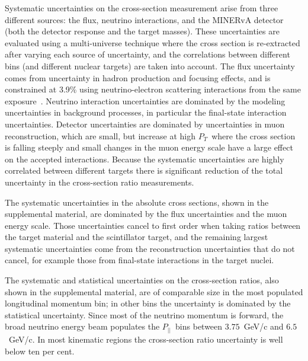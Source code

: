 \documentclass[aps,prl,twocolumn,superscriptaddress,nofootinbib]{revtex4}
\newcommand{\ptmu}{$P_{T}$}
\newcommand{\pparmu}{$P_{||}$}
\begin{document}
Systematic uncertainties on the cross-section measurement arise from three different sources:  the flux, neutrino interactions, and the MINERvA detector (both the detector response and the target masses).  These uncertainties are evaluated using a multi-universe technique where the cross section is re-extracted after varying each source of uncertainty, and the correlations between different bins (and different nuclear targets) are taken into account.  
The flux uncertainty comes from uncertainty in hadron production and focusing effects, and is constrained at 3.9\% using neutrino-electron scattering interactions from the same exposure~\cite{MINERvA:2019mkf}. Neutrino interaction uncertainties are dominated by the modeling uncertainties in background processes, in particular the final-state interaction uncertainties.  Detector uncertainties are dominated by uncertainties in muon reconstruction, which are small, but increase at high \ptmu\ where the cross section is falling steeply and small changes in the muon energy scale have a large effect on the accepted interactions.  Because the systematic uncertainties are highly correlated between different targets there is significant reduction of the total uncertainty in the cross-section ratio measurements.  

The systematic uncertainties in the absolute cross sections, shown in the supplemental material, are dominated by the flux uncertainties and the muon energy scale.  Those uncertainties cancel to first order when taking ratios between the target material and the scintillator target, and the remaining largest systematic uncertainties come from the reconstruction uncertainties that do not cancel, for example those from final-state interactions in the target nuclei.  
  
The systematic and statistical uncertainties on the cross-section ratios, also shown in the supplemental material, are of comparable size in the most populated longitudinal momentum bin; in other bins the uncertainty is dominated by the statistical uncertainty.  Since most of the neutrino momentum is forward, the broad neutrino energy beam populates the \pparmu\  bins between $3.75$~GeV/c and $6.5$~GeV/c.  In most kinematic regions the cross-section ratio uncertainty is well below ten per cent.  
\end{document}
